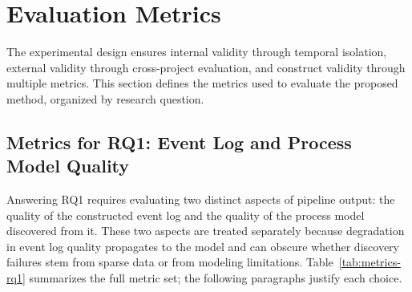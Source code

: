 \section{Evaluation Metrics}
\label{sec:evaluation-metrics}
 
The experimental design ensures internal validity through temporal isolation,
external validity through cross-project evaluation, and construct validity
through multiple metrics.
This section defines the metrics used to evaluate the proposed method,
organized by research question.
 
\subsection{Metrics for RQ1: Event Log and Process Model Quality}
\label{sec:metrics-rq1}
 
Answering RQ1 requires evaluating two distinct aspects of pipeline
output: the quality of the constructed event log and the quality
of the process model discovered from it.
These two aspects are treated separately because degradation in
event log quality propagates to the model and can obscure whether
discovery failures stem from sparse data or from modeling
limitations.
Table~\ref{tab:metrics-rq1} summarizes the full metric set;
the following paragraphs justify each choice.
 
